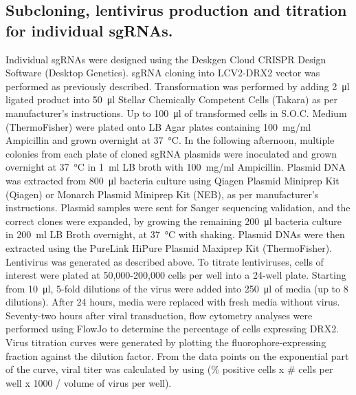 \subsection{Subcloning, lentivirus production and titration for individual sgRNAs.}
Individual sgRNAs were designed using the Deskgen Cloud CRISPR Design Software (Desktop Genetics). sgRNA cloning into LCV2-DRX2 vector was performed as previously described\cite{Sanjana2014,Shalem2014}. Transformation was performed by adding \SI{2}{\micro\litre} ligated product into \SI{50}{\micro\litre} Stellar Chemically Competent Cells (Takara) as per manufacturer's instructions. Up to \SI{100}{\micro\litre} of transformed cells in S.O.C. Medium (ThermoFisher) were plated onto LB Agar plates containing \SI{100}{\milli\gram}/ml Ampicillin and grown overnight at \SI{37}{\degreeCelsius}. In the following afternoon, multiple colonies from each plate of cloned sgRNA plasmids were inoculated and grown overnight at \SI{37}{\degreeCelsius} in \SI{1}{\milli\litre} LB broth with \SI{100}{\milli\gram}/ml Ampicillin. Plasmid DNA was extracted from \SI{800}{\micro\litre} bacteria culture using Qiagen Plasmid Miniprep Kit (Qiagen) or Monarch Plasmid Miniprep Kit (NEB), as per manufacturer's instructions. Plasmid samples were sent for Sanger sequencing validation, and the correct clones were expanded, by growing the remaining \SI{200}{\micro\litre} bacteria culture in \SI{200}{\milli\litre} LB Broth overnight, at \SI{37}{\degreeCelsius} with shaking. Plasmid DNAs were then extracted using the PureLink HiPure Plasmid Maxiprep Kit (ThermoFisher). Lentivirus was generated as described above. To titrate lentiviruses, cells of interest were plated at 50,000-200,000 cells per well into a 24-well plate. Starting from \SI{10}{\micro\litre}, 5-fold dilutions of the virus were added into \SI{250}{\micro\litre} of media (up to 8 dilutions). After 24 hours, media were replaced with fresh media without virus. Seventy-two hours after viral transduction, flow cytometry analyses were performed using FlowJo to determine the percentage of cells expressing DRX2. Virus titration curves were generated by plotting the fluorophore-expressing fraction against the dilution factor. From the data points on the exponential part of the curve, viral titer was calculated by using (\% positive cells x \# cells per well x 1000 / volume of virus per well).

